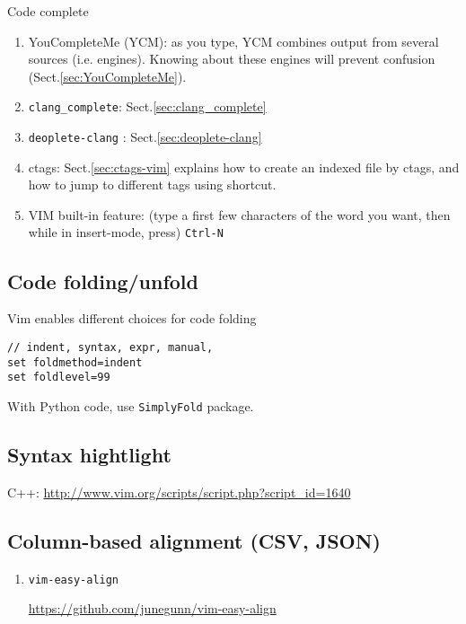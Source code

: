 Code complete
  \begin{enumerate}

\item YouCompleteMe (YCM): as you type, YCM combines output from several
sources (i.e. engines). Knowing about these engines will prevent confusion
(Sect.\ref{sec:YouCompleteMe}).

\item \verb!clang_complete!: Sect.\ref{sec:clang_complete}

\item \verb!deoplete-clang! : Sect.\ref{sec:deoplete-clang}

\item ctags: Sect.\ref{sec:ctags-vim} explains how to create an indexed file
by ctags, and how to jump to different tags using shortcut.
 
\item VIM built-in feature: (type a first few characters of the word you
want, then while in insert-mode, press) \verb!Ctrl-N!  
  \end{enumerate}


\subsection{Code folding/unfold}

Vim enables different choices for code folding
\begin{verbatim}
// indent, syntax, expr, manual, 
set foldmethod=indent
set foldlevel=99
\end{verbatim}

With Python code, use \verb!SimplyFold! package.

\subsection{Syntax hightlight}

C++: \url{http://www.vim.org/scripts/script.php?script_id=1640}


\subsection{Column-based alignment (CSV, JSON)}


\begin{enumerate}
  \item \verb!vim-easy-align!
  
  \url{https://github.com/junegunn/vim-easy-align}
  
\end{enumerate}


